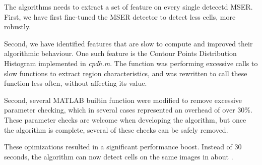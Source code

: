 		The algorithms needs to extract a set of feature on every single detecetd MSER. First, we have first fine-tuned the MSER detector to detect less cells, more robustly.
		
		Second, we have identified features that are slow to compute and improved their algorithmic behaviour. One such feature is the Contour Points Distribution Histogram implemented in \textit{cpdh.m}. The function was performing excessive calls to slow functions to extract region characteristics, and was rewritten to call these function less often, without affecting its value.
		
		Second, several MATLAB builtin function were modified to remove excessive parameter checking, which in several cases represented an overhead of over $30\%$. These parameter checks are welcome when developing the algorithm, but once the algorithm is complete, several of these checks can be safely removed. 
		
		These opimizations resulted in a significant performance boost. Instead of 30 seconds, the algorithm can now detect cells on the same images in about .
		
	
